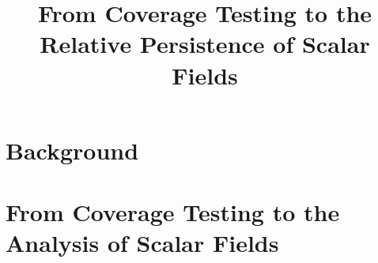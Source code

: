 \documentclass[12pt]{article}
\title{From Coverage Testing to the Relative Persistence of Scalar Fields}
\begin{document}
  \maketitle

  
  
  \clearpage

  \section{Background}
  
  
  
  
  \clearpage

  \section{From Coverage Testing to the Analysis of Scalar Fields}
  
  

  
  
\end{document}
